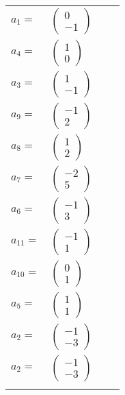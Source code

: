 \documentclass[1p]{elsarticle_modified}
\theoremstyle{definition}
\begin{document}
\begin{tabular}{m{7pt} m{180pt} m{7pt} m{180pt} }
\flushright $a_{1}=$&$\begin{pmatrix}0\\-1\end{pmatrix}$ \\
\flushright $a_{4}=$&$\begin{pmatrix}1\\0\end{pmatrix}$ \\
\flushright $a_{3}=$&$\begin{pmatrix}1\\-1\end{pmatrix}$ \\
\flushright $a_{9}=$&$\begin{pmatrix}-1\\2\end{pmatrix}$ \\
\flushright $a_{8}=$&$\begin{pmatrix}1\\2\end{pmatrix}$ \\
\flushright $a_{7}=$&$\begin{pmatrix}-2\\5\end{pmatrix}$ \\
\flushright $a_{6}=$&$\begin{pmatrix}-1\\3\end{pmatrix}$ \\
\flushright $a_{11}=$&$\begin{pmatrix}-1\\1\end{pmatrix}$ \\
\flushright $a_{10}=$&$\begin{pmatrix}0\\1\end{pmatrix}$ \\
\flushright $a_{5}=$&$\begin{pmatrix}1\\1\end{pmatrix}$ \\
\flushright $a_{2}=$&$\begin{pmatrix}-1\\-3\end{pmatrix}$\\ \flushright $a_{2}=$&$\begin{pmatrix}-1\\-3\end{pmatrix}$\\&\end{tabular}
\end{document}
